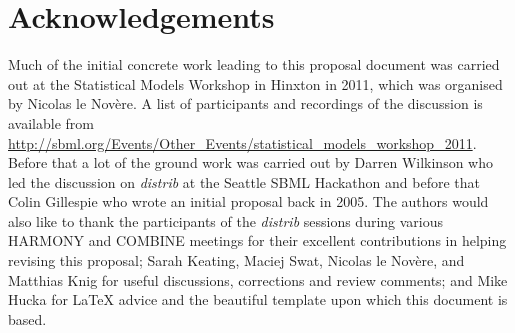 \documentclass[draftspec]{sbmlpkgspec}
\newcommand{\distribshort}{\emph{distrib}\xspace}
\begin{document}
\section{Acknowledgements}
\label{sec:acknowledgements}

Much of the initial concrete work leading to this proposal document
was carried out at the Statistical Models Workshop in Hinxton in 2011,
which was organised by Nicolas le Nov\`{e}re. A list of participants
and recordings of the discussion is available from
\url{http://sbml.org/Events/Other_Events/statistical_models_workshop_2011}.
Before that a lot of the ground work was carried out by Darren
Wilkinson who led the discussion on \distribshort at the Seattle SBML
Hackathon and before that Colin Gillespie who wrote an initial
proposal back in 2005. The authors would also like to thank the
participants of the \distribshort sessions during various HARMONY and
COMBINE meetings for their excellent contributions in helping revising
this proposal; Sarah Keating, Maciej Swat, Nicolas le Nov\`{e}re, and Matthias Knig
for useful discussions, corrections and review comments; and Mike
Hucka for \LaTeX{} advice and the beautiful template upon which this
document is based.

\appendix










\end{document}
